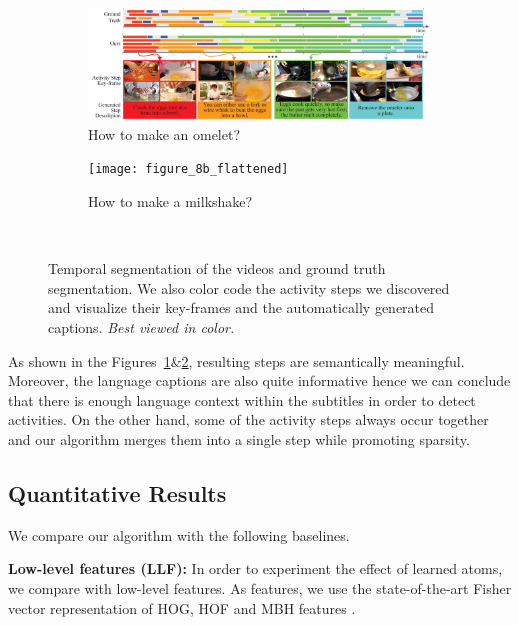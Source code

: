 \begin{figure}[ht]
  \begin{subfigure}[b]{\textwidth}
    \includegraphics[width=\textwidth]{figure_8a_flattened}
    \vspace{-5mm}
    \caption{How to make an omelet?}
    \vspace{-1mm}
    \label{recipe:ommelette}
  \end{subfigure}

  \begin{subfigure}[b]{\textwidth}
    \texttt{[image: figure\_8b\_flattened]}
    \caption{How to make a milkshake?}
    \vspace{-3mm}
    \label{recipe:milkshake}
  \end{subfigure}~
\caption{Temporal segmentation of the videos and ground truth segmentation. We also color code the activity steps we discovered and visualize their key-frames and the automatically generated captions. \emph{Best viewed in color.}}
\label{recipe:overall}
\vspace{-3mm}
\end{figure}

As shown in the Figures~\ref{recipe:ommelette}\&\ref{recipe:milkshake}, resulting steps are semantically meaningful. Moreover, the language captions are also quite informative hence we can conclude that there is enough language context within the subtitles in order to detect activities. On the other hand, some of the activity steps always occur together and our algorithm merges them into a single step while promoting sparsity.

\subsection{Quantitative Results}
We compare our algorithm with the following baselines.

\noindent\textbf{Low-level features (LLF):}
In order to experiment the effect of learned atoms, we compare with low-level features. As features, we use the state-of-the-art Fisher vector representation of HOG, HOF and MBH features \cite{THUMOS14}.

